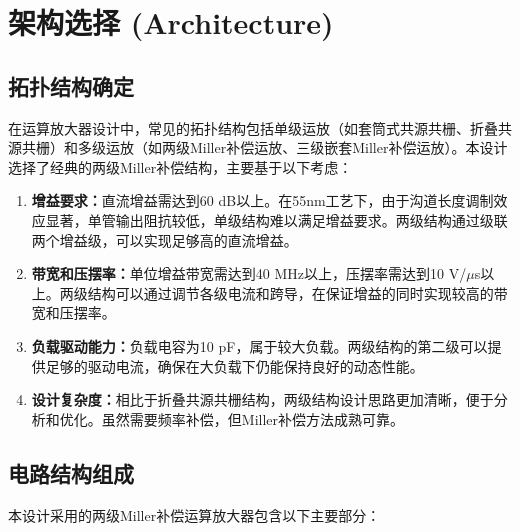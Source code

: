 \documentclass[UTF8,12pt,a4paper]{ctexart}
\begin{document}
\section{架构选择 (Architecture)}

\subsection{拓扑结构确定}

在运算放大器设计中，常见的拓扑结构包括单级运放（如套筒式共源共栅、折叠共源共栅）和多级运放（如两级Miller补偿运放、三级嵌套Miller补偿运放）。本设计选择了经典的两级Miller补偿结构，主要基于以下考虑：

\begin{enumerate}
    \item \textbf{增益要求：}直流增益需达到60 dB以上。在55nm工艺下，由于沟道长度调制效应显著，单管输出阻抗较低，单级结构难以满足增益要求。两级结构通过级联两个增益级，可以实现足够高的直流增益。
    
    \item \textbf{带宽和压摆率：}单位增益带宽需达到40 MHz以上，压摆率需达到10 V/$\mu$s以上。两级结构可以通过调节各级电流和跨导，在保证增益的同时实现较高的带宽和压摆率。
    
    \item \textbf{负载驱动能力：}负载电容为10 pF，属于较大负载。两级结构的第二级可以提供足够的驱动电流，确保在大负载下仍能保持良好的动态性能。
    
    \item \textbf{设计复杂度：}相比于折叠共源共栅结构，两级结构设计思路更加清晰，便于分析和优化。虽然需要频率补偿，但Miller补偿方法成熟可靠。
\end{enumerate}

\subsection{电路结构组成}

本设计采用的两级Miller补偿运算放大器包含以下主要部分：
\end{document}
